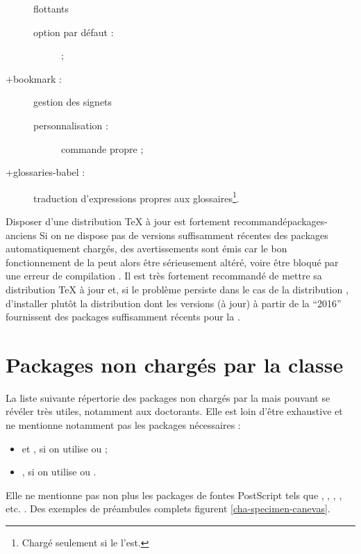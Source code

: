 \begin{description}
  flottants%
  \begin{description}
  \item[option par défaut :]  ;
  \end{description}
\item[\package+{bookmark} :] gestion des signets%
  \begin{description}
  \item[personnalisation :] commande propre  ;
  \end{description}
\item[\package*+{glossaries-babel} :] traduction d'expressions propres aux
  glossaires\footnote{Chargé seulement si le  l'est.}.
\end{description}

\begin{dbremark}{Disposer d'une distribution \TeX{} à jour est fortement
    recommandé}{packages-anciens}
  Si on ne dispose pas de versions suffisamment récentes des packages
  automatiquement chargés, des avertissements sont émis car le bon
  fonctionnement de la \yatCl{} peut alors être sérieusement altéré, voire être
  bloqué par une erreur de compilation . Il
  est très fortement recommandé de mettre sa distribution \TeX{} à jour et, si
  le problème persiste dans le cas de la distribution \miktex{},
  d'installer plutôt la distribution \texlive{} dont les versions (à
  jour) à partir de la \enquote{2016} fournissent des packages suffisamment
  récents pour la \yatCl{}.
\end{dbremark}

\section{Packages non chargés par la classe}\label{sec-packages-non-charges}

La liste suivante répertorie des packages non chargés par la \yatCl{} mais
pouvant se révéler très utiles, notamment aux doctorants.  Elle est loin d'être
exhaustive et ne mentionne notamment pas les packages nécessaires :
\begin{itemize}
\item {} et , si on utilise
   ou
   ;
\item {}, si on utilise
   ou
  .
\end{itemize}
Elle ne mentionne pas non plus les packages de
fontes PostScript tels que
, , , ,
etc. . Des exemples de préambules complets figurent
\vref{cha-specimen-canevas}.

